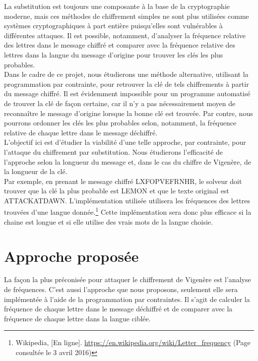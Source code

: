 \documentclass[11pt]{article}
\begin{document}
		La substitution est toujours une composante à la base de la cryptographie moderne, mais ces méthodes de chiffrement simples ne sont plus utilisées comme systèmes cryptographiques à part entière puisqu'elles sont vulnérables à différentes attaques. Il est possible, notamment, d'analyser la fréquence relative des lettres dans le message chiffré et comparer avec la fréquence relative des lettres dans la langue du message d'origine pour trouver les clés les plus probables.\\

		Dans le cadre de ce projet, nous étudierons une méthode alternative, utilisant la programmation par contrainte, pour retrouver la clé de tels chiffrements à partir du message chiffré. Il est évidemment impossible pour un programme automatisé de trouver la clé de façon certaine, car il n'y a pas nécessairement moyen de reconnaître le message d'origine lorsque la bonne clé est trouvée. Par contre, nous pourrons ordonner les clés les plus probables selon, notamment, la fréquence relative de chaque lettre dans le message déchiffré.\\

		L'objectif ici est d'étudier la viabilité d'une telle approche, par contrainte, pour l'attaque du chiffrement par substitution. Nous étudierons l'efficacité de l'approche selon la longueur du message et, dans le cas du chiffre de Vigenère, de la longueur de la clé.\\

		Par exemple, en prenant le message chiffré LXFOPVEFRNHR, le solveur doit trouver que la clé la plus probable est LEMON et que le texte original est ATTACKATDAWN. L'implémentation utilisée utilisera les fréquences des lettres trouvées d'une langue donnée.\footnote{Wikipedia, [En ligne]. \url{https://en.wikipedia.org/wiki/Letter\_frequency} (Page consultée le 3 avril 2016)} Cette implémentation sera donc plus efficace si la chaine est longue et si elle utilise des vrais mots de la langue choisie.\\

	\section{Approche proposée}

		La façon la plus préconisée pour attaquer le chiffrement de Vigenère est l'analyse de fréquences. C'est aussi l'approche que nous proposons, seulement elle sera implémentée à l'aide de la programmation par contraintes. Il s'agit de calculer la fréquence de chaque lettre dans le message déchiffré et de comparer avec la fréquence de chaque lettre dans la langue ciblée.
\end{document}
